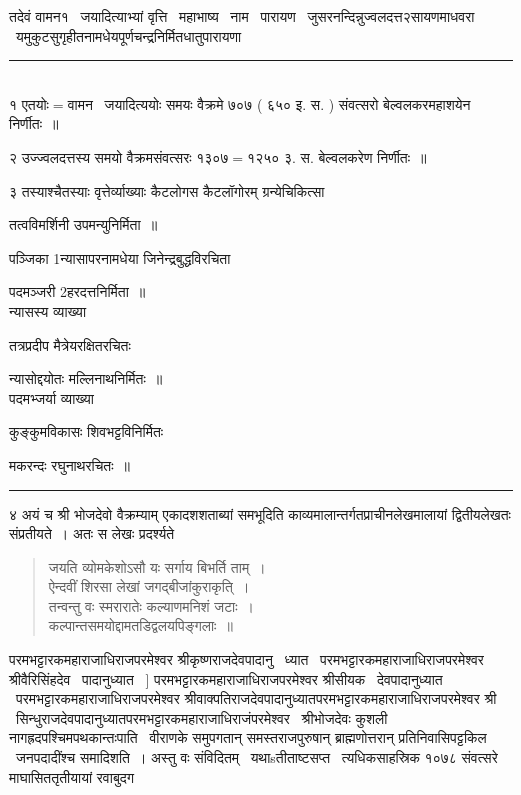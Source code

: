 \documentclass[11pt, openany]{book}
\begin{document}
\begin{multicols}{2}
तदेवं वामन१ \textendash\ जयादित्याभ्यां
वृत्ति \textendash\ महाभाष्य \textendash\ नाम \textendash\ पारायण \textendash\ जुसरनन्दिन्नुज्वलदत्त२सायणमाधवरा \textendash\ यमुकुटसुगृहीतनामधेयपूर्णचन्द्रनिर्मितधातुपारायणा \textendash\

\noindent
\rule{1\linewidth}{0.5pt}\\

१ एतयोः$=$वामन \textendash\ जयादित्ययोः समयः वैक्रमे ७०७ ( ६५० इ. स. ) संवत्सरो बेल्वलकरमहाशयेन निर्णीतः~॥ 

२ उज्ज्वलदत्तस्य समयो वैक्रमसंवत्सरः १३०७$=$१२५० ३. स. बेल्वलकरेण निर्णीतः~॥ 

३ तस्याश्चैतस्याः वृत्तेर्व्याख्याः कैटलोगस कैटलॉगोरम् ग्रन्येचिकित्सा

तत्वविमर्शिनी उपमन्युनिर्मिता~॥ 

पञ्जिका 1न्यासापरनामधेया जिनेन्द्रबुद्धविरचिता 

पदमञ्जरी 2हरदत्तनिर्मिता~॥\\
न्यासस्य व्याख्या \textendash\ 

तत्रप्रदीप मैत्रेयरक्षितरचितः 

न्यासोद्दयोतः मल्लिनाथनिर्मितः~॥ \\
पदमभ्जर्या व्याख्या \textendash\ 

कुङ्कुमविकासः शिवभट्टविनिर्मितः 

मकरन्दः रघुनाथरचितः~॥

\begin{center}
\rule{0.1\linewidth}{0.5pt}
\end{center}

४ अयं च श्री भोजदेवो वैक्रम्याम् एकादशशताब्यां समभूदिति काव्यमालान्तर्गतप्राचीनलेखमालायां द्वितीयलेखतः संप्रतीयते~। अतः स लेखः प्रदर्श्यते \textendash\

\begin{quote}
{\qt जयति व्योमकेशोऽसौ यः सर्गाय बिभर्ति ताम्~।\\
ऐन्दवीं शिरसा लेखां जगद्बीजांकुराकृति्~।\\
तन्वन्तु वः स्मरारातेः कल्याणमनिशं जटाः~।\\
कल्पान्तसमयोद्दामतडिद्वलयपिङ्गलाः~॥}
\end{quote}

परमभट्टारकमहाराजाधिराजपरमेश्वर श्रीकृष्णराजदेवपादानु \textendash\ ध्यात \textendash\ परमभट्टारकमहाराजाधिराजपरमेश्वर श्रीवैरिसिंहदेव \textendash\ पादानुध्यात \textendash\ ] परमभट्टारकमहाराजाधिराजपरमेश्वर श्रीसीयक \textendash\ देवपादानुध्यात \textendash\ परमभट्टारकमहाराजाधिराजपरमेश्वर श्रीवाक्पतिराजदेवपादानुध्यातपरमभट्टारकमहाराजाधिराजपरमेश्वर श्री \textendash\ सिन्धुराजदेवपादानुध्यातपरमभट्टारकमहाराजाधिराजंपरमेश्वर \textendash\ श्रीभोजदेवः कुशली नागह्रदपश्चिमपथकान्तःपाति \textendash\ वीराणके समुपगतान् समस्तराजपुरुषान् ब्राह्मणोत्तरान् प्रतिनिवासिपट्टकिल \textendash\ जनपदादींश्च समादिशति~। अस्तु वः संविदितम् \textendash\ यथाsतीताष्टसप्त \textendash\ त्यधिकसाहस्रिक १०७८ संवत्सरे माघासिततृतीयायां रवाबुदग \textendash\


\end{multicols}
\end{document}
